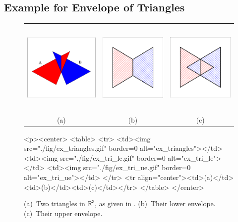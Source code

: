 \subsection{Example for Envelope of Triangles}

\begin{figure}[t]
\begin{ccTexOnly}
  \begin{center}
  \begin{tabular}{ccc}
    \includegraphics[height=1.8in]{Envelope_3/fig/ex_triangles} &
    \includegraphics[height=1.8in]{Envelope_3/fig/ex_tri_le} &
    \includegraphics[height=1.8in]{Envelope_3/fig/ex_tri_ue} \\
    {\small (a)} & {\small (b)} & {\small (c)}
  \end{tabular}
  \end{center}
\end{ccTexOnly}
\begin{ccHtmlOnly}
  <p><center>
  <table>
  <tr>
  <td><img src="./fig/ex_triangles.gif" border=0 alt="ex_triangles"></td>
  <td><img src="./fig/ex_tri_le.gif" border=0 alt="ex_tri_le"></td>
  <td><img src="./fig/ex_tri_ue.gif" border=0 alt="ex_tri_ue"></td>
  </tr>
  <tr align="center"><td>(a)</td><td>(b)</td><td>(c)</td></tr>
  </table>
  </center>
\end{ccHtmlOnly}
\caption{(a)~Two triangles in ${\mathbb R}^3$, as given in
. (b)~Their lower envelope.
(c)~Their upper envelope.\label{env3_fig:ex_tri}}
\end{figure}

